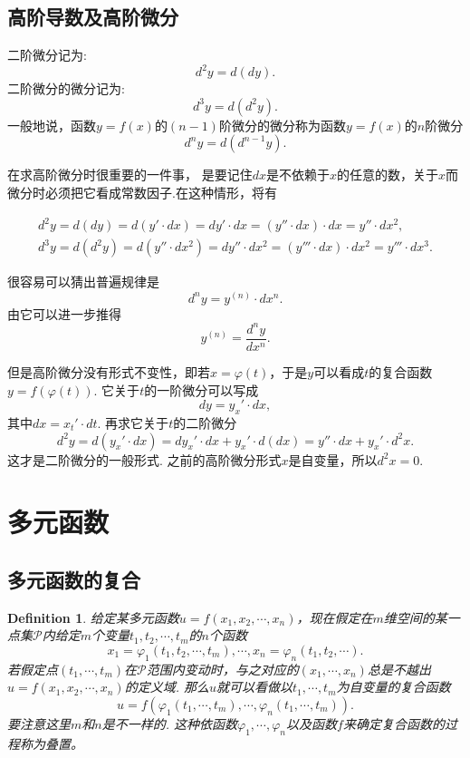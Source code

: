 \documentclass{article}
\newtheorem{definition}[theorem]{Definition}
\begin{document}
\subsection{高阶导数及高阶微分}

二阶微分记为:\[d^2 y =d(dy).\]二阶微分的微分记为:\[d^3 y = d(d^2 y).\]一般地说，函数$y=f(x)$的$(n-1)$阶微分的微分称为函数$y=f(x)$的$n$阶微分\[d^n y  = d(d^{n-1} y).\]

在求高阶微分时很重要的一件事，{\color{red} 是要记住$dx$是不依赖于$x$的任意的数，关于$x$而微分时必须把它看成常数因子}.在这种情形，将有

\begin{align*}
	d^2 y = d(dy) = d(y' \cdot dx) = dy' \cdot dx = (y'' \cdot dx) \cdot dx = y'' \cdot dx^2, \\
	d^3 y = d(d^2 y) = d(y'' \cdot dx^2) =dy'' \cdot dx^2 = (y'''\cdot dx)\cdot dx^2 = y''' \cdot dx^3.
\end{align*}

很容易可以猜出普遍规律是\[d^n y = y^{(n)} \cdot dx^n.\]由它可以进一步推得\[y^{(n)} = \frac{d^n y}{d x^n}.\]

{\color{blue} 但是高阶微分没有形式不变性}，即若$x = \varphi(t)$，于是$y$可以看成$t$的复合函数$y = f(\varphi(t))$. 它关于$t$的一阶微分可以写成\[dy =y_x' \cdot dx,\]其中$dx = x_t' \cdot dt$. 再求它关于$t$的二阶微分\[d^2 y = d(y_x' \cdot dx) = dy_x' \cdot dx + y_x' \cdot d(dx) = y'' \cdot dx + y_x' \cdot d^2 x.\]这才是二阶微分的一般形式. 之前的高阶微分形式$x$是自变量，所以$d^2 x = 0$.

\newpage
\section{多元函数}

\subsection{多元函数的复合}
\begin{definition}
\rm 给定某多元函数$u = f(x_1,x_2,\cdots,x_n)$，现在假定在$m$维空间的某一点集$\mathcal{P}$内给定$m$个变量$t_1,t_2,\cdots,t_m$的$n$个函数
$$
x_1 = \varphi_1(t_1,t_2,\cdots,t_m),\cdots,x_n = \varphi_n(t_1,t_2,\cdots).
$$
若假定点$(t_1,\cdots,t_m)$在$\mathcal{P}$范围内变动时，与之对应的$(x_1,\cdots,x_n)$总是不越出$u = f(x_1,x_2,\cdots,x_n)$的定义域. 那么$u$就可以看做以$t_1, \cdots,t_m$为自变量的复合函数
$$
u = f(\varphi_1(t_1,\cdots,t_m),\cdots,\varphi_n(t_1,\cdots,t_m)).
$$
要注意这里$m$和$n$是不一样的. {\color{red} 这种依函数$\varphi_1,\cdots,\varphi_n$以及函数$f$来确定复合函数的过程称为叠置}。
\end{definition}
\end{document}
